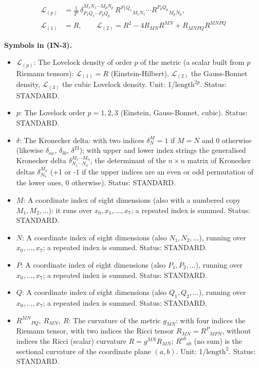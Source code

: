 \documentclass[
  10pt,
]{article}
\providecommand{\tightlist}{%
  \setlength{\itemsep}{0pt}\setlength{\parskip}{0pt}}
\begin{document}
\[
\begin{aligned}
\mathcal{L}_{(p)} &= \frac{1}{2^{p}}\,\delta^{M_1N_1\cdots M_pN_p}_{P_1Q_1\cdots P_pQ_p}\,
 R^{P_1Q_1}{}_{M_1N_1}\cdots R^{P_pQ_p}{}_{M_pN_p},\\
\mathcal{L}_{(1)} &= R,\qquad \mathcal{L}_{(2)} = R^2 - 4R_{MN}R^{MN} + R_{MNPQ}R^{MNPQ}
\end{aligned} \tag{IN-3}
\]

\textbf{Symbols in (IN-3).}

\begin{itemize}
\tightlist
\item
  \(\mathcal{L}_{(p)}\): The Lovelock density of order \(p\) of the
  metric (a scalar built from \(p\) Riemann tensors):
  \(\mathcal{L}_{(1)} = R\) (Einstein-Hilbert), \(\mathcal{L}_{(2)}\)
  the Gauss-Bonnet density, \(\mathcal{L}_{(3)}\) the cubic Lovelock
  density. Unit: 1/\(\mathrm{length}^{2p}\). Status: STANDARD.
\item
  \(p\): The Lovelock order \(p = 1, 2, 3\) (Einstein, Gauss-Bonnet,
  cubic). Status: STANDARD.
\item
  \(\delta\): The Kronecker delta: with two indices \(\delta^M_N = 1\)
  if \(M = N\) and 0 otherwise (likewise \(\delta_{\alpha e}\),
  \(\delta_{l0}\), \(\delta^{I3}\)); with upper and lower index strings
  the generalised Kronecker delta
  \(\delta^{M_1\cdots M_n}_{N_1\cdots N_n}\), the determinant of the
  \(n \times n\) matrix of Kronecker deltas \(\delta^{M_a}_{N_b}\) (+1
  or -1 if the upper indices are an even or odd permutation of the lower
  ones, 0 otherwise). Status: STANDARD.
\item
  \(M\): A coordinate index of eight dimensions (also with a numbered
  copy \(M_1, M_2, \dots\)): it runs over \(x_0, x_1, \dots, x_7\); a
  repeated index is summed. Status: STANDARD.
\item
  \(N\): A coordinate index of eight dimensions (also
  \(N_1, N_2, \dots\)), running over \(x_0, \dots, x_7\); a repeated
  index is summed. Status: STANDARD.
\item
  \(P\): A coordinate index of eight dimensions (also
  \(P_1, P_2, \dots\)), running over \(x_0, \dots, x_7\); a repeated
  index is summed. Status: STANDARD.
\item
  \(Q\): A coordinate index of eight dimensions (also
  \(Q_1, Q_2, \dots\)), running over \(x_0, \dots, x_7\); a repeated
  index is summed. Status: STANDARD.
\item
  \(R^{MN}{}_{PQ},\ R_{MN},\ R\): The curvature of the metric
  \(g_{MN}\): with four indices the Riemann tensor, with two indices the
  Ricci tensor \(R_{MN} = R^P{}_{MPN}\), without indices the Ricci
  (scalar) curvature \(R = g^{MN}R_{MN}\); \(R^{ab}{}_{ab}\) (no sum) is
  the sectional curvature of the coordinate plane \((a, b)\). Unit:
  1/\(\mathrm{length}^{2}\). Status: STANDARD.
\end{itemize}
\end{document}
